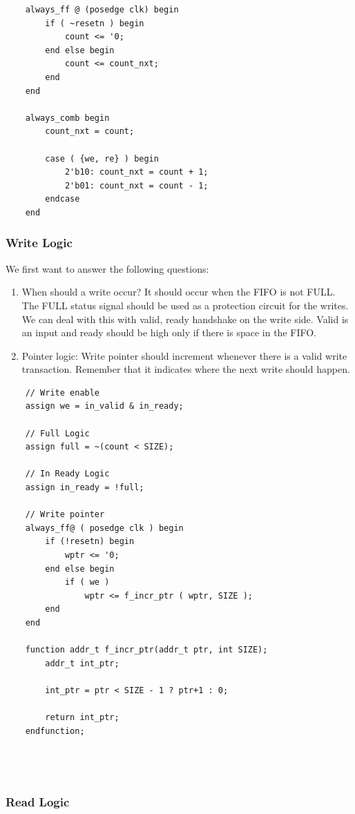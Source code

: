 \documentclass{article}
\begin{document}
\begin{Verbatim}
	always_ff @ (posedge clk) begin
		if ( ~resetn ) begin
			count <= '0;
		end else begin 
			count <= count_nxt;
		end 
	end	
	
	always_comb begin
		count_nxt = count;
		
		case ( {we, re} ) begin
			2'b10: count_nxt = count + 1;
			2'b01: count_nxt = count - 1;
		endcase
	end 
\end{Verbatim}


\subsubsection{Write Logic}

We first want to answer the following questions:
\begin{enumerate}
	\item When should a write occur? It should occur when the FIFO is not FULL. The FULL status signal should be used as a protection circuit for the writes. We can deal with this with valid, ready handshake on the write side. Valid is an input and ready should be high only if there is space in the FIFO. 
	\item Pointer logic: Write pointer should increment whenever there is a valid write transaction. Remember that it indicates where the next write should happen.
\end{enumerate}

\begin{Verbatim}
	// Write enable
	assign we = in_valid & in_ready;
	
	// Full Logic
	assign full = ~(count < SIZE); 	
	
	// In Ready Logic
	assign in_ready = !full;
	
	// Write pointer
	always_ff@ ( posedge clk ) begin 
		if (!resetn) begin
			wptr <= '0;
		end else begin
			if ( we )
				wptr <= f_incr_ptr ( wptr, SIZE );
		end
	end
	
	function addr_t f_incr_ptr(addr_t ptr, int SIZE);
		addr_t int_ptr;
		
		int_ptr = ptr < SIZE - 1 ? ptr+1 : 0;
	
		return int_ptr;
	endfunction;
	
	
	
\end{Verbatim}


\subsubsection{Read Logic}
\end{document}
